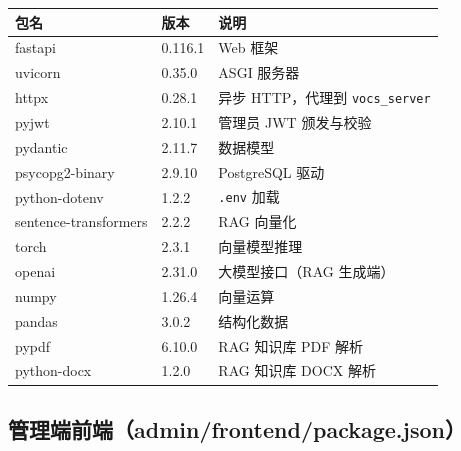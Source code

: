 \documentclass[UTF8,a4paper,11pt]{ctexart}
\begin{document}
\begin{longtable}{L{3.8cm} L{2.2cm} L{7.0cm}}
\toprule
\textbf{包名} & \textbf{版本} & \textbf{说明} \\
\midrule
\endhead
fastapi                   & 0.116.1 & Web 框架 \\
uvicorn                   & 0.35.0  & ASGI 服务器 \\
httpx                     & 0.28.1  & 异步 HTTP，代理到 \texttt{vocs\_server} \\
pyjwt                     & 2.10.1  & 管理员 JWT 颁发与校验 \\
pydantic                  & 2.11.7  & 数据模型 \\
psycopg2-binary           & 2.9.10  & PostgreSQL 驱动 \\
python-dotenv             & 1.2.2   & \texttt{.env} 加载 \\
sentence-transformers     & 2.2.2   & RAG 向量化 \\
torch                     & 2.3.1   & 向量模型推理 \\
openai                    & 2.31.0  & 大模型接口（RAG 生成端） \\
numpy                     & 1.26.4  & 向量运算 \\
pandas                    & 3.0.2   & 结构化数据 \\
pypdf                     & 6.10.0  & RAG 知识库 PDF 解析 \\
python-docx               & 1.2.0   & RAG 知识库 DOCX 解析 \\
\bottomrule
\end{longtable}

\subsection{管理端前端（admin/frontend/package.json）}
\end{document}
